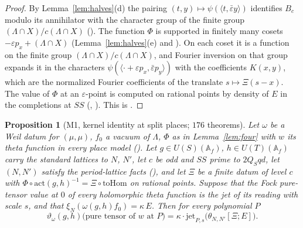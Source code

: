 \documentclass[11pt]{article}
\newcommand{\Af}{\mathbb A_f}
\newtheorem{proposition}[theorem]{Proposition}
\theoremstyle{remark}
\begin{document}
\begin{proof}
By Lemma~\ref{lem:halves}(d) the pairing $(t,y)\mapsto\psi(\langle t,\bar\varepsilon y\rangle)$ identifies $B_c$ modulo its annihilator with the character group of the finite group $(\Lambda\cap X)/c(\Lambda\cap X)$ (). The function $\Phi$ is supported in finitely many cosets $-\varepsilon p_x+(\Lambda\cap X)$ (Lemma~\ref{lem:halves}(e) and ). On each coset it is a function on the finite group $(\Lambda\cap X)/c(\Lambda\cap X)$, and Fourier inversion on that group expands it in the characters $\psi(\langle\cdot+\varepsilon p_x,\bar\varepsilon p_y\rangle)$ with the coefficients $K(x,y)$, which are the normalized Fourier coefficients of the translate $s\mapsto\Xi(s-x)$. The value of $\Phi$ at an $\varepsilon$-point is computed on rational points by density of $E$ in the completions at $SS$ (, ). This is .
\end{proof}

\begin{proposition}[M1, kernel identity at split places; $176$ theorems]\label{prop:M1}
Let $\omega$ be a Weil datum for $(\mu,\mu)$, $f_0$ a vacuum of $\Lambda$, $\Phi$ as in Lemma~\ref{lem:four} with $w$ its theta function in every place model (). Let $g\in U(S)(\Af)$, $h\in U(T)(\Af)$ carry the standard lattices to $N$, $N'$, let $c$ be odd and $SS$ prime to $2Q_Sqd$, let $(N,N')$ satisfy the period-lattice facts (), and let $\Xi$ be a finite datum of level $c$ with $\Phi\circ\mathrm{act}(g,h)^{-1}=\Xi\circ\mathrm{toHom}$ on rational points. Suppose that the Fock pure-tensor value at $0$ of every holomorphic theta function is the jet of its reading with scale $s$, and that $\xi_N(\omega(g,h)f_0)=\kappa\,E$. Then for every polynomial $P$
\[
\vartheta_\omega(g,h)\bigl(\text{pure tensor of }w\text{ at }P\bigr)=\kappa\cdot\mathrm{jet}_{P,s}\bigl(\theta_{N,N'}[\Xi;E]\bigr).
\]
\end{proposition}
\end{document}
